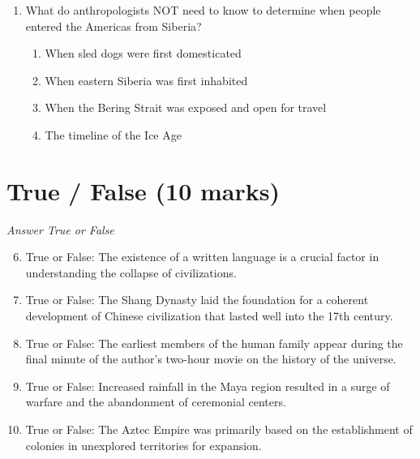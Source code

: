 \documentclass[12pt]{article}
\begin{document}
\begin{enumerate}[label=\arabic*.]
\begin{enumerate}[label=(\alph*)]
    \item bonobos
    \item orangutans
    \item gibbons
    \item chimpanzees
    \item baboons
\end{enumerate}
\item What do anthropologists NOT need to know to determine when people entered the Americas
from Siberia?
\begin{enumerate}[label=(\alph*)]
    \item When sled dogs were first domesticated
    \item When eastern Siberia was first inhabited
    \item When the Bering Strait was exposed and open for travel
    \item The timeline of the Ice Age
\end{enumerate}
\end{enumerate}

\section*{True / False (10 marks)}
\textit{Answer True or False}
\begin{enumerate}[label=\arabic*.]
\setcounter{enumi}{5}
\item True or False: The existence of a written language is a crucial factor in understanding the collapse of civilizations.
\item True or False: The Shang Dynasty laid the foundation for a coherent development of Chinese civilization that lasted well into the 17th century.
\item True or False: The earliest members of the human family appear during the final minute of the author's two-hour movie on the history of the universe.
\item True or False: Increased rainfall in the Maya region resulted in a surge of warfare and the abandonment of ceremonial centers.
\item True or False: The Aztec Empire was primarily based on the establishment of colonies in unexplored territories for expansion.
\end{enumerate}
\end{document}
